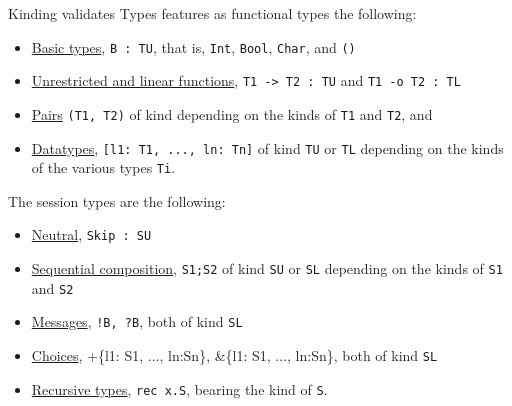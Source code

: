 \documentclass[10pt]{beamer}
\begin{document}
\begin{frame}{Kinding validates Types}
\freest{} features as functional types the following:
\begin{itemize}
\item \underline{Basic types}, \lstinline|B : TU|, that is, \lstinline|Int|,
  \lstinline|Bool|, \lstinline|Char|, and \lstinline|()|
\item \underline{Unrestricted and linear functions}, \lstinline|T1 -> T2 : TU| and
  \lstinline|T1 -o T2 : TL|
\item \underline{Pairs} \lstinline|(T1, T2)| of kind
  depending on the kinds of
  \lstinline|T1| and \lstinline|T2|, and
\item \underline{Datatypes}, \lstinline|[l1: T1, ..., ln: Tn]| of kind
  \lstinline|TU| or \lstinline|TL| depending on the kinds of the
  various types \lstinline|Ti|.
\end{itemize}
\pause

The session types are the following:
\begin{itemize}
\item \underline{Neutral}, \lstinline|Skip : SU|
\item \underline{Sequential composition}, \lstinline|S1;S2| of kind \lstinline|SU|
  or \lstinline|SL| depending on the kinds of \lstinline|S1| and
  \lstinline|S2|
\item  \underline{Messages}, \lstinline|!B, ?B|, both of kind \lstinline|SL|
\item \underline{Choices}, +\{l1: S1, ..., ln:Sn\}, \&\{l1: S1, ..., ln:Sn\},
  both of kind \lstinline|SL|
\item \underline{Recursive types}, \lstinline|rec x.S|, bearing the kind of
  \lstinline|S|.
\end{itemize}
	
\end{frame}
\end{document}
